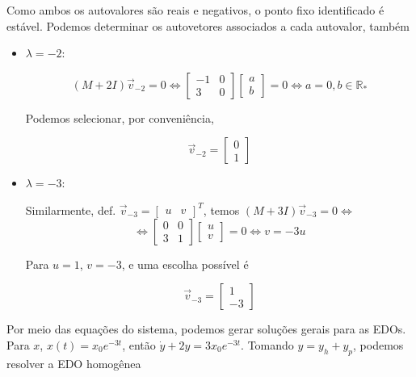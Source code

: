\documentclass[9pt,a4paper]{tau-class/tau}
\theoremstyle{definition}
\numberwithin{definition}{subsection}
\numberwithin{theorem}{subsection}
\numberwithin{example}{subsection}
\numberwithin{observation}{subsection}
\numberwithin{lemma}{subsection}
\begin{document}
    Como ambos os autovalores são reais e negativos, o ponto fixo identificado é estável. Podemos determinar os autovetores associados a cada autovalor, também 

    \begin{itemize}
        \item $\lambda = -2$: 

        \[(M + 2I)\vec{v}_{-2} = 0 \iff \begin{bmatrix}
            -1 & 0 \\
            3 & 0 
        \end{bmatrix}\begin{bmatrix}
            a \\
            b
        \end{bmatrix} = 0 \iff a = 0, b \in \mathbb{R}_*\]

        Podemos selecionar, por conveniência, 

        \[\vec{v}_{-2} = \begin{bmatrix}
            0 \\
            1
        \end{bmatrix}\]

        \item $\lambda = -3$: 

        Similarmente, def. $\vec v_{-3} = \begin{bmatrix}
            u & v
        \end{bmatrix}^T$, temos $(M + 3I)\vec v_{-3} = 0 \iff $
        \[\iff \begin{bmatrix}
            0 & 0 \\
            3 & 1
        \end{bmatrix}\begin{bmatrix}
            u \\
            v
        \end{bmatrix} = 0 \iff v = -3u\]

        Para $u = 1$, $v = -3$, e uma escolha possível é 

        \[\vec v_{-3} = \begin{bmatrix}
            1 \\
            -3 
        \end{bmatrix}\]
        
    \end{itemize}

    Por meio das equações do sistema, podemos gerar soluções gerais para as EDOs. Para $x$, $x(t) = x_0 e^{-3t}$, então $\dot{y} + 2y = 3x_0e^{-3t}$. Tomando $y = y_h + y_p$, podemos resolver a EDO homogênea 
\end{document}
